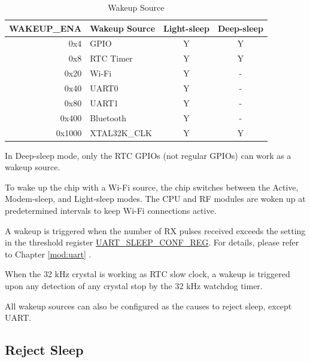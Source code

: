 \documentclass[main\_\_EN.tex]{subfiles}
\begin{document}
\begin{table}[H]
    \centering
    \caption{Wakeup Source}
    \label{tab:lpm-wakeup-source}
    \begin{threeparttable}
    \begin{tabular}{| r | l | c | c |} 
    \hline
    \rowcolor{lightgray}
    \textbf{WAKEUP\_ENA} & \textbf{Wakeup Source\tnote{5}} &  \textbf{Light-sleep} & \textbf{Deep-sleep}  \\\hline
    0x4 & GPIO\tnote{1} & Y & Y \\\hline
    0x8 & RTC Timer & Y & Y \\\hline
    0x20 & Wi-Fi\tnote{2} & Y & - \\\hline
    0x40 & UART0\tnote{3} & Y & - \\\hline
    0x80 & UART1\tnote{3} & Y & - \\\hline
    0x400 & Bluetooth & Y & - \\\hline
    0x1000 & XTAL32K\_CLK\tnote{4} & Y & Y \\\hline
    \end{tabular}
    \begin{tablenotes}
        \item[1] In Deep-sleep mode, only the RTC GPIOs (not regular GPIOs) can work as a wakeup source.
        \item[2] To wake up the chip with a Wi-Fi source, the chip switches between the Active, Modem-sleep, and Light-sleep modes. The CPU and RF modules are woken up at predetermined intervals to keep Wi-Fi connections active.
        \item[3] A wakeup is triggered when the number of RX pulses received exceeds the setting in the threshold register \hyperref[regdesc:UARTSLEEPCONFREG]{UART\_SLEEP\_CONF\_REG}. For details, please refer to Chapter \ref{mod:uart} \textit{}.
        \item[4] When the 32 kHz crystal is working as RTC slow clock, a wakeup is triggered upon any detection of any crystal stop by the 32 kHz watchdog timer.
        \item [5] All wakeup sources can also be configured as the causes to reject sleep, except UART. 
    \end{tablenotes}
    \end{threeparttable}
\end{table}

\subsection{Reject Sleep}\label{sec:lpm-reject-source}
\end{document}
